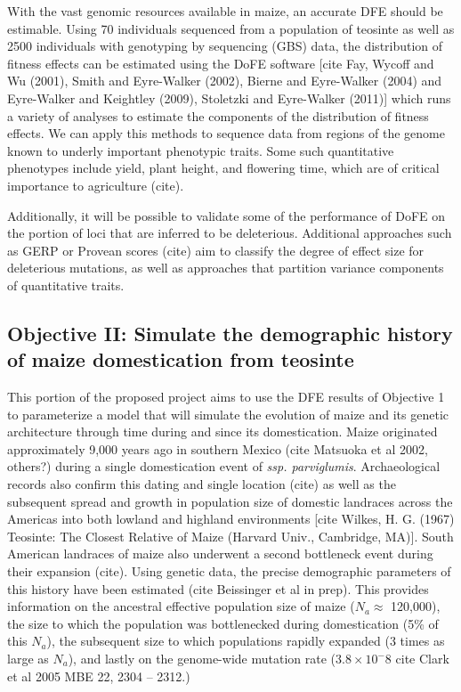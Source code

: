 With the vast genomic resources available in maize, an accurate DFE should be estimable. Using 70 individuals sequenced from a population of teosinte as well as 2500 individuals with genotyping by sequencing (GBS) data, the distribution of fitness effects can be estimated using the DoFE software [cite Fay, Wycoff and Wu (2001), Smith and Eyre-Walker (2002), Bierne and Eyre-Walker (2004) and Eyre-Walker and Keightley (2009), Stoletzki and Eyre-Walker (2011)] which runs a variety of analyses to estimate the components of the distribution of fitness effects. We can apply this methods to sequence data from regions of the genome known to underly important phenotypic traits. Some such quantitative phenotypes include yield, plant height, and flowering time, which are of critical importance to agriculture (cite).

Additionally, it will be possible to validate some of the performance of DoFE on the portion of loci that are inferred to be deleterious. Additional approaches such as GERP or Provean scores (cite) aim to classify the degree of effect size for deleterious mutations, as well as approaches that partition variance components of quantitative traits.
	

\subsection*{Objective II: Simulate the demographic history of maize domestication from teosinte}

This portion of the proposed project aims to use the DFE results of Objective 1 to parameterize a model that will simulate the evolution of maize and its genetic architecture through time during and since its domestication.
Maize originated approximately 9,000 years ago in southern Mexico (cite Matsuoka et al 2002, others?) during a single domestication event of \emph{ssp. parviglumis}. Archaeological records also confirm this dating and single location (cite) as well as the subsequent spread and growth in population size of domestic landraces across the Americas into both lowland and highland environments [cite Wilkes, H. G. (1967) Teosinte: The Closest Relative of Maize (Harvard Univ., Cambridge, MA)]. South American landraces of maize also underwent a second bottleneck event during their expansion (cite). Using genetic data, the precise demographic parameters of this history have been estimated (cite Beissinger et al in prep). This provides information on the ancestral effective population size of maize ($N_a \approx$ 120,000), the size to which the population was bottlenecked during domestication (5\% of this $N_a$), the subsequent size to which populations rapidly expanded (3 times as large as $N_a$), and lastly on the genome-wide mutation rate ($3.8\times10^-8$ cite Clark et al 2005 MBE 22, 2304 -- 2312.)

